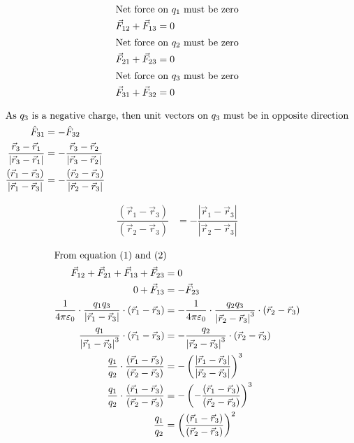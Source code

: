\documentclass{article}
\begin{document}
\addtolength{\jot}{3ex}
\begin{align}
\intertext{Net force on $q_1$ must be zero}
\vec{F}_{12} + \vec{F}_{13} &= 0\\
\intertext{Net force on $q_2$ must be zero}
\vec{F}_{21} + \vec{F}_{23} &= 0\\
\intertext{Net force on $q_3$ must be zero}
\vec{F}_{31} + \vec{F}_{32} &= 0
\end{align}
\pagebreak

\def\RPOTH{\left(\vec{r}_1-\vec{r}_3\right)}
\def\RMOTH{\left|\vec{r}_1-\vec{r}_3\right|}
\def\RPOTW{\left(\vec{r}_1-\vec{r}_2\right)}
\def\RMOTW{\left|\vec{r}_1-\vec{r}_2\right|}
\def\RPTWTH{\left(\vec{r}_2-\vec{r}_3\right)}
\def\RMTWTH{\left|\vec{r}_2-\vec{r}_3\right|}
\def\K{\dfrac{1}{4\pi\varepsilon_0}}


\begin{align*}
\intertext{As $q_3$ is a negative charge, then unit vectors on $q_3$ must be in opposite direction}
\hat{F}_{31} &= - \hat{F}_{32}\\
\dfrac{\vec{r}_3-\vec{r}_1}{\left| \vec{r}_3-\vec{r}_1\right|} &= -\dfrac{\vec{r}_3-\vec{r}_2}{\left| \vec{r}_3-\vec{r}_2\right|}\\
\dfrac{\RPOTH}{\RMOTH} &= -\dfrac{\RPTWTH}{\RMTWTH}
\end{align*}

\begin{align}
\dfrac{\RPOTH}{\RPTWTH} &= -\dfrac{\RMOTH}{\RMTWTH}
\end{align}

\begin{align*}
\intertext{From equation (1) and (2)}
\vec{F}_{12} + \vec{F}_{21} + \vec{F}_{13} + \vec{F}_{23} &= 0\\
0+ \vec{F}_{13}  &=-\vec{F}_{23} \\
\K \cdot \dfrac{q_1q_3}{\RMOTH} \cdot \RPOTH &= -\K \cdot \dfrac{q_2q_3}{\RMTWTH^3} \cdot \RPTWTH\\
\dfrac{q_1}{\RMOTH^3} \cdot \RPOTH &= - \dfrac{q_2}{\RMTWTH^3} \cdot \RPTWTH\\
\dfrac{q_1}{q_2} \cdot \dfrac{\RPOTH}{\RPTWTH} &= - \left(\dfrac{\RMOTH}{\RMTWTH}\right)^3\\
\dfrac{q_1}{q_2} \cdot \dfrac{\RPOTH}{\RPTWTH} &= - \left(-\dfrac{\RPOTH}{\RPTWTH}\right)^3\\
\dfrac{q_1}{q_2} &= \left(\dfrac{\RPOTH}{\RPTWTH}\right)^2\\
\end{align*}
\end{document}
